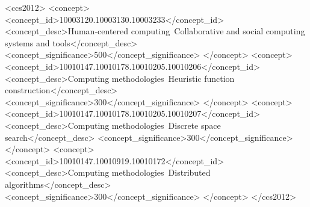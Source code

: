 \documentclass[sigconf]{acmart}
\begin{document}
%
%
\begin{CCSXML}
<ccs2012>
<concept>
<concept_id>10003120.10003130.10003233</concept_id>
<concept_desc>Human-centered computing~Collaborative and social computing systems and tools</concept_desc>
<concept_significance>500</concept_significance>
</concept>
<concept>
<concept_id>10010147.10010178.10010205.10010206</concept_id>
<concept_desc>Computing methodologies~Heuristic function construction</concept_desc>
<concept_significance>300</concept_significance>
</concept>
<concept>
<concept_id>10010147.10010178.10010205.10010207</concept_id>
<concept_desc>Computing methodologies~Discrete space search</concept_desc>
<concept_significance>300</concept_significance>
</concept>
<concept>
<concept_id>10010147.10010919.10010172</concept_id>
<concept_desc>Computing methodologies~Distributed algorithms</concept_desc>
<concept_significance>300</concept_significance>
</concept>
</ccs2012>
\end{CCSXML}




\maketitle




 
\end{document}
